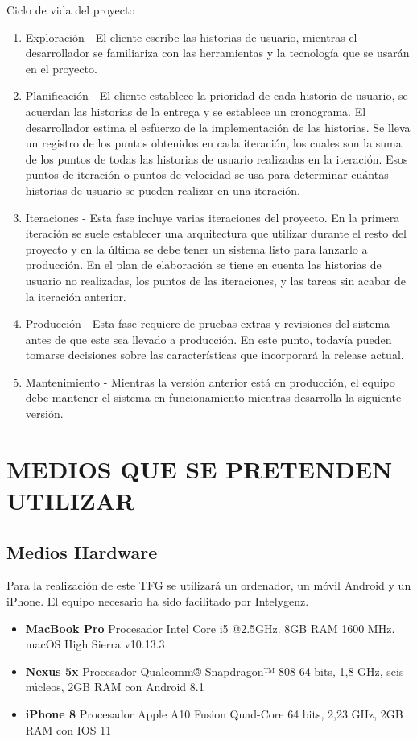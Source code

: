 \documentclass{pre-tfg}
\begin{document}
    Ciclo de vida del proyecto~\cite{XPKENT}:
    \begin{enumerate}
        \item Exploración - El cliente escribe las historias de usuario, mientras el desarrollador se familiariza
        con las herramientas y la tecnología que se usarán en el proyecto.
        \item Planificación - El cliente establece la prioridad de cada historia de usuario, se acuerdan las historias
        de la entrega y se establece un cronograma. El desarrollador estima el esfuerzo de la implementación de las
        historias. Se lleva un registro de los puntos obtenidos en cada iteración, los cuales son la suma de los puntos
        de todas las historias de usuario realizadas en la iteración. Esos puntos de iteración o puntos de velocidad
        se usa para determinar cuántas historias de usuario se pueden realizar en una iteración.
        \item Iteraciones - Esta fase incluye varias iteraciones del proyecto. En la primera iteración se suele
        establecer una arquitectura que utilizar durante el resto del proyecto y en la última se debe tener un sistema
        listo para lanzarlo a producción. En el plan de elaboración se tiene en cuenta las historias de usuario
        no realizadas, los puntos de las iteraciones, y las tareas sin acabar de la iteración anterior.
        \item Producción - Esta fase requiere de pruebas extras y revisiones del sistema antes de que
        este sea llevado a producción. En este punto, todavía pueden tomarse decisiones sobre las características
        que incorporará la release actual.
        \item Mantenimiento - Mientras la versión anterior está en producción, el equipo debe mantener el sistema
        en funcionamiento mientras desarrolla la siguiente versión.
    \end{enumerate}


    \section{MEDIOS QUE SE PRETENDEN UTILIZAR}

    \subsection{Medios Hardware}

    Para la realización de este TFG se utilizará un ordenador, un móvil Android y un iPhone.
    El equipo necesario ha sido facilitado por Intelygenz.
    \begin{itemize}
        \item \textbf{MacBook Pro} Procesador Intel Core i5 @2.5GHz. 8GB RAM 1600 MHz. macOS High Sierra v10.13.3
        \item \textbf{Nexus 5x} Procesador Qualcomm® Snapdragon™ 808 64 bits, 1,8 GHz, seis núcleos, 2GB RAM con Android 8.1
        \item \textbf{iPhone 8} Procesador Apple A10 Fusion Quad-Core 64 bits, 2,23 GHz, 2GB RAM con IOS 11
    \end{itemize}
\end{document}
